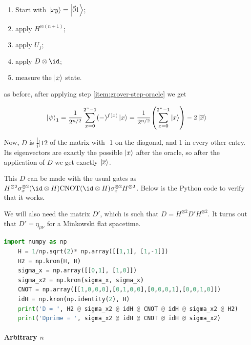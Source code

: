 \documentclass[main.tex]{subfiles}
\begin{document}
\begin{enumerate}
    \item Start with \(\ket{xy} = \ket{\vec{0}1}\);
    \item apply \(H ^{\otimes (n+1)} \);
    \item apply \(U_f\); \label{item:grover-step-oracle}
    \item apply \(D \otimes \id\);
    \item measure the \(\ket{x} \) state.
\end{enumerate}

as before, after applying step \ref{item:grover-step-oracle} we get

\begin{equation} \label{eq:grover-oracle-state}
    \ket\psi_1
    = \frac{1}{2^{n/2}} \sum _{x=0}   ^{2^n-1}
    (-)^{f(x)}\ket{x}
    = \frac{1}{2^{n/2}}\qty( \sum _{x=0}   ^{2^n-1}
    \ket{x}) - 2 \ket{\overline{x} }
\end{equation}

Now, \(D\) is \(\frac[i]{1}{2} \) of the matrix with -1 on the diagonal, and 1 in every other entry. Its eigenvectors are exactly the possible \(\ket{x} \) after the oracle, so after the application of \(D\) we get exactly \(\ket{\overline{x} } \).

This \(D\) can be made with the usual gates as \(H^{\otimes 2} \sigma_x^{\otimes 2} (\id \otimes H) \text{CNOT} (\id \otimes H) \sigma_x^{\otimes 2} H^{\otimes 2}\). Below is the Python code to verify that it works.

We will also need the matrix \(D'\), which is such that \(D = H^{\otimes 2} D' H^{\otimes 2}\). It turns out that \(D' = \eta_{\mu \nu}\) for a Minkowski flat spacetime.

\begin{lstlisting}[language=Python]
    import numpy as np
    H = 1/np.sqrt(2)* np.array([[1,1], [1,-1]])
    H2 = np.kron(H, H)
    sigma_x = np.array([[0,1], [1,0]])
    sigma_x2 = np.kron(sigma_x, sigma_x)
    CNOT = np.array([[1,0,0,0],[0,1,0,0],[0,0,0,1],[0,0,1,0]])
    idH = np.kron(np.identity(2), H)
    print('D = ', H2 @ sigma_x2 @ idH @ CNOT @ idH @ sigma_x2 @ H2)
    print('Dprime = ', sigma_x2 @ idH @ CNOT @ idH @ sigma_x2)
\end{lstlisting}

\paragraph{Arbitrary \(n\)}
\end{document}
